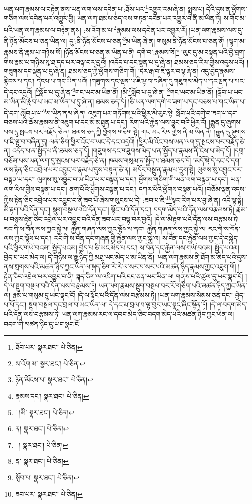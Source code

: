ཡན་ལག་རྣམས་ལ་བརྟེན་ནས་ཡན་ལག་ལས་དབེན་པ་:ཐོས་པར་\footnote{ཐོབ་པར་  སྣར་ཐང་།  པེ་ཅིན། }འགྱུར་རམ་ཞེ་ན། སྨྲས་པ། དེའི་དུས་ན་ཕྱོགས་གཅིག་ལས་དབེན་པར་འགྱུར་གྱི། ཡན་ལག་ཐམས་ཅད་ལས་གཏན་དབེན་པར་འགྱུར་བ་ནི་མ་ཡིན་ཏེ། ས་གོང་མ་པའི་ཡན་ལག་རྣམས་ལ་བརྟེན་ནས། :ས་འོག་མ་པ་\footnote{ས་འོག་མ་  སྣར་ཐང་།  པེ་ཅིན། }རྣམས་ལས་དབེན་པར་འགྱུར་རོ། །ཡན་ལག་རྣམས་ལས་དུ་ནི་ཉོན་མོངས་པ་ཅན་ཡིན་ལ། དུ་:ནི་ཉོན་མོངས་པ་ཅན་\footnote{ཉོན་མོངས་པ་  སྣར་ཐང་།  པེ་ཅིན། }མ་ཡིན་ཞེ་ན། གསུམ་ནི་ཉོན་མོངས་པ་ཅན་ནོ། །ལྷག་མ་རྣམས་ནི་རྣམ་པ་གཉིས་སོ། །ཉོན་མོངས་པ་ཅན་མ་ཡིན་པ་ནི། དགེ་བ་:རྣམས་སོ།\footnote{རྣམས་དང་།  སྣར་ཐང་།  པེ་ཅིན། } །ལུང་དུ་མ་བསྟན་པའི་བྱེ་བྲག་གིས་རྣམ་པ་གཉིས་སུ་ཐ་དད་པར་བལྟ་བར་བྱའོ། །འདོད་པ་དང་ལྡན་པ་དུ་ཞེ་ན། ཐམས་ཅད་རིལ་གྱིས་འདུས་པའོ། །གཟུགས་དང་ལྡན་པ་དུ་ཞེ་ན། ཐམས་ཅད་ཀྱི་ཕྱོགས་གཅིག་གོ། །དེར་རྒ་བ་ཇི་ལྟར་བལྟ་ཞེ་ན། འདུ་བྱེད་རྣམས་རྙིངས་པ་དང་། དེངས་པ་གང་ཡིན་པའོ། །གཟུགས་དང་ལྡན་པ་ཇི་ལྟ་བ་བཞིན་དུ་གཟུགས་མེད་པ་དང་ལྡན་པ་ཡང་དེ་དང་འདྲའོ། །\footnote{། །མི་  སྣར་ཐང་།  པེ་ཅིན། }སློབ་པ་དུ་ཞེ་ན་\footnote{ན།   སྣར་ཐང་།  པེ་ཅིན། }གང་ཡང་མ་ཡིན་ནོ། །མི་\footnote{། །  སྣར་ཐང་།  པེ་ཅིན། }སློབ་པ་དུ་ཞེ་ན། \footnote{ན་  སྣར་ཐང་།  པེ་ཅིན། }གང་ཡང་མ་ཡིན་ནོ། །སློབ་པ་ཡང་མ་ཡིན་མི་སློབ་པ་ཡང་མ་ཡིན་པ་དུ་ཞེ་ན། ཐམས་ཅད་དོ། །ཅི་ཡན་ལག་དགེ་བ་ཟག་པ་དང་བཅས་པ་གང་ཡིན་པ་དེ་དག་:སློབ་པ་པ་\footnote{སློབ་པ་  སྣར་ཐང་།  པེ་ཅིན། }མ་ཡིན་ནམ་ཞེ་ན། འཇུག་པར་གཏོགས་པའི་ཕྱིར་མི་རུང་སྟེ། སློབ་པའི་དགེ་བ་ཟག་པ་དང་བཅས་པའི་ཆོས་རྣམས་ནི་འཇུག་པ་དང་མི་མཐུན་པ་དང་། རིག་པའི་རྐྱེན་ལས་བྱུང་བའི་ཕྱིར་རོ། །རྒྱུན་དུ་ཞུགས་པས་དུ་སྤངས་པར་བརྗོད་ཅེ་ན། ཐམས་ཅད་ཀྱི་ཕྱོགས་གཅིག་སྟེ། གང་ཡང་རིལ་གྱིས་ནི་མ་ཡིན་ནོ། །རྒྱུན་དུ་ཞུགས་པ་ཇི་ལྟ་བ་བཞིན་དུ། ལན་ཅིག་ཕྱིར་འོང་བ་ཡང་དེ་དང་འདྲའོ། །ཕྱིར་མི་འོང་བས་ཡན་ལག་དུ་སྤངས་པར་བརྗོད་ཅེ་ན། འདོད་པ་ན་སྤྱོད་པ་ནི་ཐམས་ཅད་དོ། །གཟུགས་དང་གཟུགས་མེད་པ་ན་སྤྱོད་པ་རྣམས་ནི་ངེས་པ་མེད་དོ། །དགྲ་བཅོམ་པས་ཡན་ལག་དུ་སྤངས་པར་བརྗོད་ཅེ་ན། ཁམས་གསུམ་ན་སྤྱོད་པ་ཐམས་ཅད་དོ། །མདོ་སྡེ་དེ་དང་དེ་དག་ལས་རྟེན་ཅིང་འབྲེལ་པར་འབྱུང་བ་རྣམ་པ་དུས་བསྟན་ཅེ་ན། མདོར་བསྡུ་ན་རྣམ་པ་དྲུག་སྟེ། ལུགས་སུ་འབྱུང་བར་བསྟན་པ་དང་། ལུགས་སུ་འབྱུང་བ་མ་ཡིན་པར་བསྟན་པ་དང་། ཕྱོགས་གཅིག་གི་ཡན་ལག་བསྟན་པ་དང་། ཡན་ལག་རིལ་གྱིས་བསྟན་པ་དང་། ནག་པོའི་ཕྱོགས་བསྟན་པ་དང་། དཀར་པོའི་ཕྱོགས་བསྟན་པའོ། །བཅོམ་ལྡན་འདས་ཀྱིས་རྟེན་ཅིང་འབྲེལ་པར་འབྱུང་བ་ནི་ཟབ་པོ་ཞེས་གསུངས་པ་དེ། :ཟབ་པ་ཇི་\footnote{ཟབ་པར་  སྣར་ཐང་།  པེ་ཅིན། }ལྟར་རིག་པར་བྱ་ཞེ་ན། འདི་ལྟ་སྟེ། མི་རྟག་པའི་དོན་དང་། སྡུག་བསྔལ་བའི་དོན་དང་། སྟོང་པའི་དོན་དང་། བདག་མེད་པའི་དོན་ལས་བརྩམས་ཏེ། རྣམ་པ་བཅུས་རྟེན་ཅིང་འབྲེལ་པར་འབྱུང་བའི་དོན་ཟབ་པར་བལྟ་བར་བྱའོ། །དེ་ལ་མི་རྟག་པའི་དོན་ལས་བརྩམས་ཏེ། རང་གི་ས་བོན་ལས་ཀྱང་སྐྱེ་ལ། རྐྱེན་གཞན་ལས་ཀྱང་ལྟོས་པ་དང་། རྐྱེན་གཞན་ལས་ཀྱང་སྐྱེ་ལ། རང་གི་ས་བོན་ལས་ཀྱང་ལྟོས་པ་དང་། རང་གི་ས་བོན་དང་གཞན་གྱི་རྐྱེན་ལས་ཀྱང་སྐྱེ་ལ། ས་བོན་དང་རྐྱེན་ལས་ཀྱང་དེ་བསྐྱེད་པའི་ཕྱིར་གཡོ་བའམ། སྤྱོད་པའམ། བྱེད་པ་ཅི་ཡང་མེད་པ་དང་། ས་བོན་དང་རྐྱེན་ལས་གཡོ་བའམ། སྤྱོད་པའམ། བྱེད་པ་ཡང་མེད་ལ། དེ་གཉིས་ལ་རྒྱུ་ཉིད་ཀྱི་མཐུ་ཡང་མེད་པ་མ་ཡིན་ནོ། །ཡན་ལག་རྣམས་ནི་ཐོག་མ་མེད་པའི་དུས་ནས་གྲགས་པའི་མཚན་ཉིད་ཀྱང་ཡིན་ལ་སྐད་ཅིག་རེ་རེ་ལ་སར་པ་སར་པའི་མཚན་ཉིད་རྣམས་ཀྱང་འཇུག་གོ། །རྟེན་ཅིང་འབྲེལ་པར་འབྱུང་བ་ནི། སྐད་ཅིག་ལ་འཇིག་པའི་ངང་ཅན་ཡང་ཡིན་ལ། གནས་པའི་ཚུལ་དུ་ཡང་སྣང་ངོ། །དེ་ལ་སྡུག་བསྔལ་བའི་དོན་ལས་བརྩམས་ཏེ། ཡན་ལག་རྣམས་སྡུག་བསྔལ་བར་རོ་གཅིག་པའི་མཚན་ཉིད་ཀྱང་ཡིན་ལ། རྣམ་པ་གསུམ་དུ་ཡང་སྣང་ངོ། །དེ་ལ་སྟོང་པའི་དོན་ལས་བརྩམས་ཏེ། །ཡན་ལག་རྣམས་སེམས་ཅན་དང་། བྱེད་པ་པོ་དང་། སྡུག་བསྔལ་དང་བྲལ་བ་ཡང་ཡིན་ལ། དེ་དང་མ་བྲལ་བ་ལྟ་བུར་ཡང་སྣང་ཞིང་སྟོན་ཏོ། །དེ་ལ་བདག་མེད་པའི་དོན་ལས་བརྩམས་ཏེ། ཡན་ལག་རྣམས་རང་ལ་དབང་མེད་ཅིང་བདག་མེད་པའི་མཚན་ཉིད་ཀྱང་ཡིན་ལ། བདག་གི་མཚན་ཉིད་དུ་ཡང་སྣང་ངོ། 
